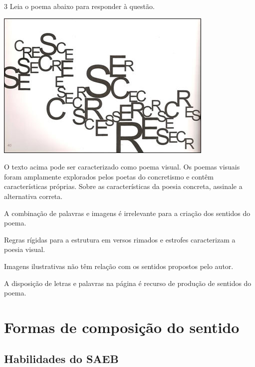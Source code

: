 \num{3} Leia o poema abaixo para responder à questão.

\includegraphics[width=4.11458in,height=2.80208in]{./imgSAEB_7_POR/media/image3.png}


O texto acima pode ser caracterizado como poema visual. Os poemas visuais
foram amplamente explorados pelos poetas do concretismo e contêm
características próprias. Sobre as características da poesia concreta,
assinale a alternativa correta.

\begin{escolha}

  \item A combinação de palavras e imagens é irrelevante para a criação dos sentidos do poema. 

  \item Regras rígidas para a estrutura em versos rimados e estrofes caracterizam a poesia visual.

  \item Imagens ilustrativas não têm relação com os sentidos propostos pelo autor.

  \item A disposição de letras e palavras na página é recurso de produção de sentidos do poema.

\end{escolha}

\chapter{Formas de composição do sentido}

\section*{Habilidades do SAEB}

